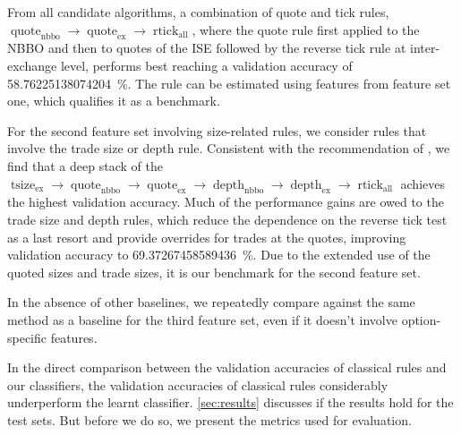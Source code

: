 From all candidate algorithms, a combination of quote and tick rules, $\operatorname{quote}_{\mathrm{nbbo}} \to \operatorname{quote}_{\mathrm{ex}} \to \operatorname{rtick}_{\mathrm{all}}$, where the quote rule first applied to the \gls{NBBO} and then to quotes of the \gls{ISE} followed by the reverse tick rule at inter-exchange level, performs best reaching a validation accuracy of \SI{58.76225138074204}{\percent}. The rule can be estimated using features from feature set one, which qualifies it as a benchmark.

For the second feature set involving size-related rules, we consider rules that involve the trade size or depth rule. Consistent with the recommendation of \textcite[][14]{grauerOptionTradeClassification2022}, we find that a deep stack of the $\operatorname{tsize}_{\mathrm{ex}} \to \operatorname{quote}_{\mathrm{nbbo}} \to \operatorname{quote}_{\mathrm{ex}} \to \operatorname{depth}_{\mathrm{nbbo}} \to \operatorname{depth}_{\mathrm{ex}} \to \operatorname{rtick}_{\mathrm{all}}$ achieves the highest validation accuracy. Much of the performance gains are owed to the trade size and depth rules, which reduce the dependence on the reverse tick test as a last resort and provide overrides for trades at the quotes, improving validation accuracy to \SI{69.37267458589436}{\percent}. Due to the extended use of the quoted sizes and trade sizes, it is our benchmark for the second feature set.

In the absence of other baselines, we repeatedly compare against the same method as a baseline for the third feature set, even if it doesn't involve option-specific features.

In the direct comparison between the validation accuracies of classical rules and our classifiers, the validation accuracies of classical rules considerably underperform the learnt classifier. \cref{sec:results} discusses if the results hold for the test sets. But before we do so, we present the metrics used
for evaluation.
